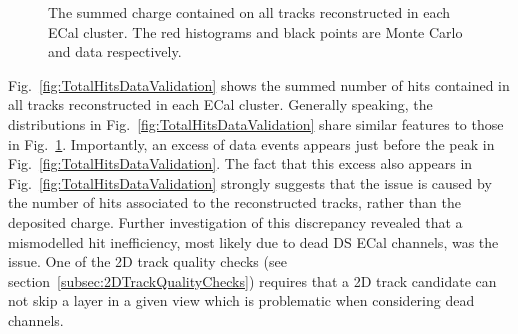 \begin{figure}%
  \centering
  \hspace{1em}
  \caption{The summed charge contained on all tracks reconstructed in each ECal cluster.  The red histograms and black points are Monte Carlo and data respectively.}
  \label{fig:TotalChargeDataValidation}
\end{figure}
\newline
\newline
Fig.~\ref{fig:TotalHitsDataValidation} shows the summed number of hits contained in all tracks reconstructed in each ECal cluster.  Generally speaking, the distributions in Fig.~\ref{fig:TotalHitsDataValidation} share similar features to those in Fig.~\ref{fig:TotalChargeDataValidation}.  Importantly, an excess of data events appears just before the peak in Fig.~\ref{fig:TotalHitsDataValidation}.  The fact that this excess also appears in Fig.~\ref{fig:TotalHitsDataValidation} strongly suggests that the issue is caused by the number of hits associated to the reconstructed tracks, rather than the deposited charge.  Further investigation of this discrepancy revealed that a mismodelled hit inefficiency, most likely due to dead DS ECal channels, was the issue.  One of the 2D track quality checks (see section~\ref{subsec:2DTrackQualityChecks}) requires that a 2D track candidate can not skip a layer in a given view which is problematic when considering dead channels.  
